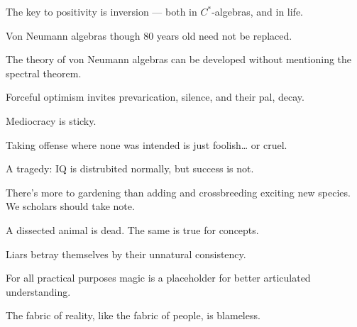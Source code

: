 \documentclass[a]{subfiles}
\begin{document}
\begin{parsec}%
The key to positivity is inversion --- both in  $C^*$-algebras,
and in life.
\end{parsec}
\begin{parsec}%
Von Neumann algebras
though 80 years old
need not be replaced.
\end{parsec}
\begin{parsec}%
The theory of von Neumann algebras
can be developed without mentioning
the spectral theorem.
\end{parsec}
\begin{parsec}%
Forceful optimism
invites prevarication, silence,
and their pal, decay.
\end{parsec}
\begin{parsec}%
Mediocracy is sticky.
\end{parsec}
\begin{parsec}%
Taking offense where none was intended
is just foolish\dots{} or cruel.
\end{parsec}
\begin{parsec}%
A tragedy:
IQ is distrubited normally,
but success is not.
\end{parsec}
\begin{parsec}%
There's more to gardening
than adding and crossbreeding exciting new species.
We scholars should take note.
\end{parsec}
\begin{parsec}%
A dissected animal is dead.
The same is true for concepts.
\end{parsec}
\begin{parsec}%
Liars betray themselves by their
unnatural consistency.
\end{parsec}
\begin{parsec}%
For all practical purposes
magic is a placeholder for better
articulated understanding.
\end{parsec}
\begin{parsec}%
The fabric
of reality,
like the fabric of people,
is blameless.
\end{parsec}
\end{document}
